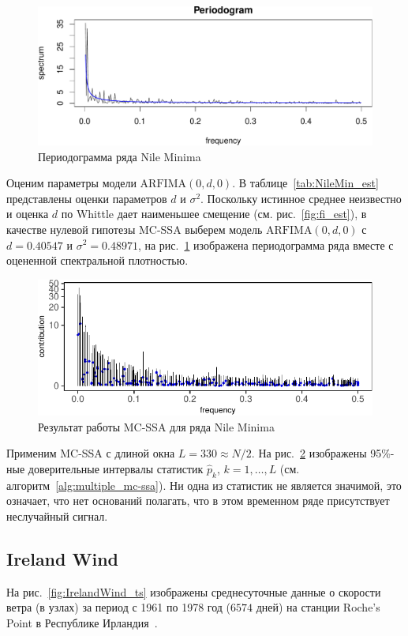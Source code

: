\documentclass[specialist,
substylefile = spbu_report.rtx,
subf,href,colorlinks=true, 12pt]{disser}
\theoremstyle{definition}
\begin{document}
\begin{figure}[h]
	\centering
	\includegraphics[width=\textwidth]{img/NileMin_per.pdf}
	\caption{Периодограмма ряда Nile Minima}
	\label{fig:NileMin_per}
\end{figure}

Оценим параметры модели $\mathrm{ARFIMA}(0, d, 0)$. В таблице~\ref{tab:NileMin_est} представлены оценки параметров $d$ и $\sigma^2$. Поскольку истинное среднее неизвестно и оценка $d$ по Whittle дает наименьшее смещение (см. рис.~\ref{fig:fi_est}), в качестве нулевой гипотезы MC-SSA выберем модель $\mathrm{ARFIMA}(0, d, 0)$ с $d=0.40547$ и $\sigma^2=0.48971$, на рис.~\ref{fig:NileMin_per} изображена периодограмма ряда вместе с оцененной спектральной плотностью.

\begin{figure}[h!]
	\centering
	\includegraphics[width=\textwidth]{img/NileMin_mcssa.pdf}
	\caption{Результат работы MC-SSA для ряда Nile Minima}
	\label{fig:NileMin_mcssa}
\end{figure}

Применим MC-SSA с длиной окна $L=330\approx N / 2$. На рис.~\ref{fig:NileMin_mcssa} изображены 95\%-ные доверительные интервалы статистик $\widehat{p}_k$, $k=1,\ldots,L$ (см. алгоритм~\ref{alg:multiple_mc-ssa}). Ни одна из статистик не является значимой, это означает, что нет оснований полагать, что в этом временном ряде присутствует неслучайный сигнал.

\subsection{Ireland Wind}
На рис.~\ref{fig:IrelandWind_ts} изображены среднесуточные данные о скорости ветра (в узлах) за период с 1961 по 1978 год ($6574$ дней) на станции Roche's Point в Республике Ирландия~\cite{Haslett1989}.
\end{document}
